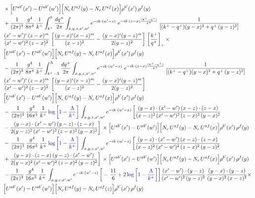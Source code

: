 \documentclass[9pt]{article}
\newcommand{\new}[1]{{\color{blue}#1}}
\numberwithin{equation}{section}
\begin{document}
\begin{align}
&\times\Big[U^{ab'}(x')-U^{ab'}(w')\Big]\Big[N_{c}\,U^{af}(y)-N_{c}\,U^{af}(x)\Big]\rho^{b'}(x')\,\rho^{f}(y)\notag \\ & + \frac{1}{(2\pi)^{3}}\,\frac{g^{4}}{8\pi^{4}}\,\frac{1}{k^{+}}\int_{k^{+}}^{0}\frac{dq^{+}}{2\pi}\int_{x,y,z,x',w'}e^{-ik\cdot(w'-z)}\ e^{-ik\cdot(z-x)\frac{(k^{+}-q^{+})}{k^{+}}}\,\frac{1}{\left[(k^{+}-q^{+})(y-x)^{2}+q^{+}\,(y-z)^{2}\right]}\notag \\ & \frac{(x'-w')^{i}\,(z-x)^{m}}{(x'-w')^{2}\,(z-x)^{2}}\,\left[\frac{(y-x)^{i}(x-z)^{m}}{(x-z)^{2}}-\frac{(y-x)^{i}(y-z)^{m}}{2(y-z)^{2}}\right]\,\left[\frac{k^{+}}{q^{+}}\right]_{+}\times\notag \\ & \Big[U^{ab'}(x')-U^{ab'}(w')\Big]\Big[N_{c}\,U^{af}(y)-N_{c}\,U^{af}(x)\Big]\rho^{b'}(x')\,\rho^{f}(y)\notag \\ & - \frac{1}{(2\pi)^{3}}\,\frac{g^{4}}{8\pi^{4}}\,\frac{1}{k^{+}}\int_{k^{+}-\Lambda}^{\Lambda}\frac{dq^{+}}{2\pi}\int_{x,y,z,x',w'}e^{-ik\cdot(w'-z)}\ e^{-ik\cdot(z-x)\frac{(k^{+}-q^{+})}{k^{+}}}\,\frac{1}{\left[(k^{+}-q^{+})(y-x)^{2}+q^{+}\,(y-z)^{2}\right]}\notag \\ & \frac{(x'-w')^{i}\,(z-x)^{m}}{(x'-w')^{2}\,(z-x)^{2}}\,\left[\frac{(y-x)^{i}(x-z)^{m}}{(x-z)^{2}}-\frac{(y-x)^{i}(y-z)^{m}}{2(y-z)^{2}}\right]\notag \\ & \Big[U^{ab'}(x')-U^{ab'}(w')\Big]\Big[N_{c}\,U^{af}(y)-N_{c}\,U^{af}(x)\Big]\rho^{b'}(x')\,\rho^{f}(y)\notag \\ & -\, \frac{1}{(2\pi)^{3}}\,\frac{g^{4}}{16\pi^{5}}\,\frac{1}{k^{+}}\, \new{\log{\left[1-\frac{\Lambda}{k^{+}}\right]}}\,\int_{x,y,z,x',w'}e^{-ik\cdot(w'-x)}\, \bigg[\frac{(y-x)\cdot (x'-w')\,(x-z)\cdot (z-x)}{(x-z)^{2}\,(x'-w')^{2}\,(z-x)^{2}\,(y-x)^{2}}\notag \\ & -\frac{(y-x)\cdot (x'-w')\,(y-z)\cdot (z-x)}{2(y-z)^{2}\,(x'-w')^{2}\,(z-x)^{2}\,(y-x)^{2}}\bigg]\,\times \Big[U^{ab'}(x')-U^{ab'}(w')\Big]\Big[N_{c}\,U^{af}(y)-N_{c}\,U^{af}(x)\Big]\rho^{b'}(x')\,\rho^{f}(y)\notag \\ & -\, \frac{1}{(2\pi)^{3}}\,\frac{g^{4}}{16\pi^{5}}\,\frac{1}{k^{+}}\,\new{\log{\left[1-\frac{\Lambda}{k^{+}}\right]}}\,\int_{x,y,z,x',w'}e^{-ik\cdot(w'-z)}\,\bigg[\frac{(y-z)\cdot (x'-w')\,(x-z)\cdot (z-x)}{(x-z)^{2}\,(x'-w')^{2}\,(z-x)^{2}\,(y-z)^{2}}\notag \\ & +\frac{(y-x)\cdot (z-x)\,(y-z)\cdot (x'-w')}{2(y-x)^{2}\,(x'-w')^{2}\,(z-x)^{2}\,(y-z)^{2}}\bigg]\,\times \Big[U^{ab'}(x')-U^{ab'}(w')\Big]\Big[N_{c}\,U^{af}(y)-N_{c}\,U^{af}(x)\Big]\rho^{b'}(x')\,\rho^{f}(y)\notag \\ & - \frac{1}{(2\pi)^{3}}\,\frac{g^{4}}{16\pi^{5}}\,\frac{1}{k^{+}}\,\int_{x,y,z,x',w'}e^{-ik\cdot(w'-z)}\,\bigg[-\,\frac{11}{6}+2\, \new{\log{\left[1-\frac{\Lambda}{k^{+}}\right]}}\bigg] \frac{(x'-w')\cdot(y-z)}{(x'-w')^{2}\,(y-z)^{2}}\,\frac{(y-x)\cdot(y-z)}{(y-x)^{2}\,(x-z)^{2}}\times\notag \\ & \Big[U^{ab'}(x')-U^{ab'}(w')\Big]\Big[N_{c}\,U^{af}(y)-N_{c}\,U^{af}(z)\Big]\rho^{b'}(x')\,\rho^{f}(y)
\end{align}
\end{document}
